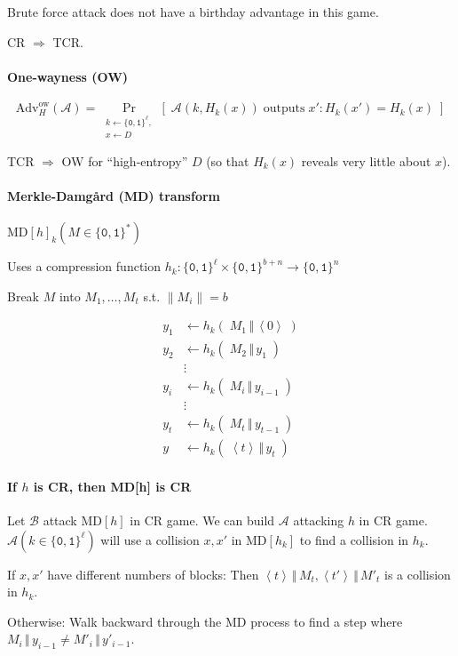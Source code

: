 \documentclass[11pt]{article}
\newcommand{\bit}{\ensuremath{\{\texttt{0},\texttt{1}\}}}
\newcommand{\ang}[1]{\ensuremath{\left\langle#1\right\rangle}}
\theoremstyle{remark}
\begin{document}
Brute force attack does not have a birthday advantage in this game.

CR $\Rightarrow$ TCR.

\paragraph{One-wayness (OW)}

\[ \text{Adv}_H^\text{ow}(\mathcal{A}) =
\Pr_{\substack{k\leftarrow\bit^\ell,\\x\leftarrow D}}
\left[\;\mathcal{A}(k, H_k(x))\;\text{outputs}\;x':H_k(x')=H_k(x)\;\right] \]

TCR $\Rightarrow$ OW for ``high-entropy'' $D$
(so that $H_k(x)$ reveals very little about $x$).

\paragraph{Merkle-Damg{\aa}rd (MD) transform}
$\text{MD}[h]_k(M\in\bit^*)$

Uses a compression function $h_k:\bit^\ell\times\bit^{b+n}\rightarrow\bit^n$

Break $M$ into $M_1,\ldots,M_t$ s.t. $\|M_i\|=b$

\begin{align*}
y_1 &\leftarrow h_k(\;M_1\,\Vert\,\ang{0}\;) \\
y_2 &\leftarrow h_k(\;M_2\,\Vert\,y_1\;) \\
&\vdots\\
y_i &\leftarrow h_k(\;M_i\,\Vert\,y_{i-1}\;) \\
&\vdots\\
y_t &\leftarrow h_k(\;M_t\,\Vert\,y_{t-1}\;) \\
y &\leftarrow h_k(\;\ang{t}\,\Vert\,y_t\;)
\end{align*}

\paragraph{If $h$ is CR, then MD[h] is CR}
Let $\mathcal{B}$ attack MD$[h]$ in CR game.
We can build $\mathcal{A}$ attacking $h$ in CR game.
$\mathcal{A}(k\in\bit^\ell)$ will use a collision
$x,x'$ in MD$[h_k]$ to find a collision in $h_k$.

If $x,x'$ have different numbers of blocks:
Then $\ang{t}\,\Vert\,M_t, \ang{t'}\,\Vert\,M'_t$ is a collision in $h_k$.

Otherwise: Walk backward through the MD process to find a step
where $M_i\,\Vert\,y_{i-1} \neq M'_i\,\Vert\,y'_{i-1}$.
\end{document}
